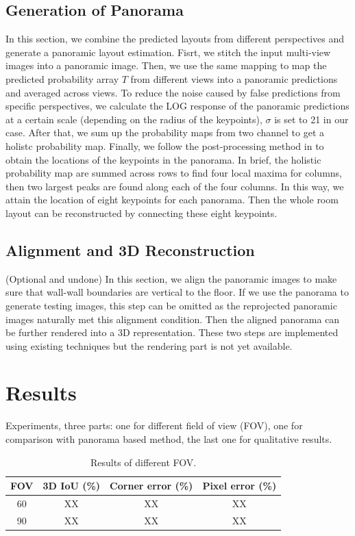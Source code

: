 \subsection{Generation of Panorama}
\label{sec:merging}
In this section, we combine the predicted layouts from different perspectives and generate a panoramic layout estimation. Fisrt, we stitch the input multi-view images into a panoramic image. Then, we use the same mapping to map the predicted probability array $T$ from different views into a panoramic predictions and averaged across views. To reduce the noise caused by false predictions from specific perspectives, we calculate the LOG response of the panoramic predictions at a certain scale (depending on the radius of the keypoints), $\sigma$ is set to 21 in our case. After that, we sum up the probability maps from two channel to get a holistc probability map. Finally, we follow the post-processing method in \cite{LayoutNet} to obtain the locations of the keypoints in the panorama. In brief, the holistic probability map are summed across rows to find four local maxima for columns, then two largest peaks are found along each of the four columns. In this way, we attain the location of eight keypoints for each panorama. Then the whole room layout can be reconstructed by connecting these eight keypoints.


\subsection{Alignment and 3D Reconstruction}
\label{sec:align}

(Optional and undone) In this section, we align the panoramic images to make sure that wall-wall boundaries are vertical to the floor. If we use the panorama to generate testing images, this step can be omitted as the reprojected panoramic images naturally met this alignment condition. Then the aligned panorama can be further rendered into a 3D representation. These two steps are implemented using existing techniques but the rendering part is not yet available. 


\section{Results}
Experiments, three parts: one for different field of view (FOV), one for comparison with panorama based method, the last one for qualitative results.

\begin{table}
	\caption{Results of different FOV.}
	\label{tab:FOV}
	\begin{tabular}{cccc}
		\toprule
		FOV &3D IoU (\%)&Corner error (\%)&Pixel error (\%)\\
		\midrule
		 60 & XX & XX & XX\\
		90 & XX & XX & XX\\	
		\bottomrule
	\end{tabular}
\end{table}

